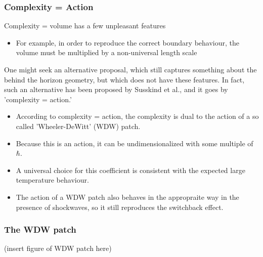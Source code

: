 \documentclass[10pt]{beamer}
\begin{document}
\begin{frame}
\frametitle{Complexity = Action}

Complexity = volume has a few unpleasant features

\begin{itemize}

\item For example, in order to reproduce the correct boundary behaviour, the volume must be multiplied by a non-universal length scale

\end{itemize}

One might seek an alternative proposal, which still captures something about the behind the horizon geometry, but which does not have these features. In fact, such an alternative has been proposed by Susskind et al., and it goes by 'complexity = action.'

\begin{itemize}

\item According to complexity = action, the complexity is dual to the action of a so called 'Wheeler-DeWitt' (WDW) patch.

\item Because this is an action, it can be undimensionalized with some multiple of $\hbar$. 

\item A universal choice for this coefficient is consistent with the expected large temperature behaviour. 

\item The action of a WDW patch also behaves in the appropraite way in the presence of shockwaves, so it still reproduces the switchback effect.

\end{itemize}

\end{frame}


\begin{frame}
\frametitle{The WDW patch}

(insert figure of WDW patch here)

\end{frame}
\end{document}
